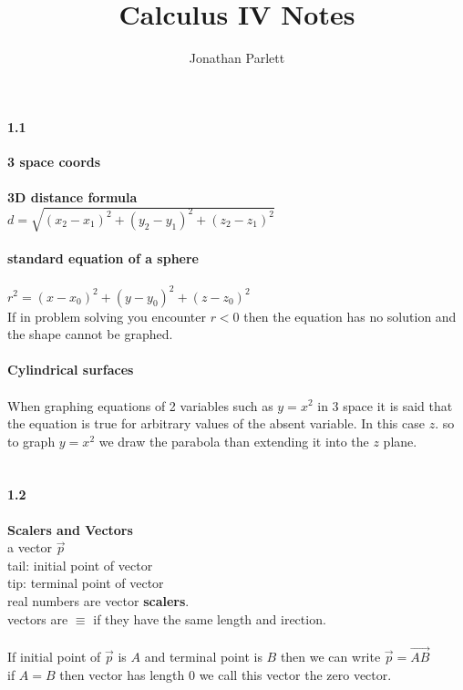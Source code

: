\documentclass[14pt]{extreport}
\title{Calculus IV Notes}
\author{Jonathan Parlett}
\begin{document}
\paragraph{1.1}\textbf{3 space coords}\\\\

\textbf{3D distance formula}\\
$d = \sqrt{(x_2 - x_1)^2 + (y_2 - y_1)^2 + (z_2 - z_1)^2}$\\\\

\textbf{standard equation of a sphere}\\\\
$r^2 = (x - x_0)^2 + (y-y_0)^2 + (z-z_0)^2$\\

If in problem solving you encounter $r < 0$ then the equation has no solution and the shape
cannot be graphed.\\\\

\textbf{Cylindrical surfaces}\\\\

When graphing equations of 2 variables such as $y = x^2$ in 3 space it is said that the equation is true for arbitrary values of the absent variable. In this case $z$. so to graph $y = x^2$ we draw the parabola than extending it into the $z$ plane.\\\\


\paragraph{1.2}\textbf{Scalers and Vectors}\\

a vector $\vec{p}$\\
tail: initial point of vector\\
tip: terminal point of vector\\
real numbers are vector \textbf{scalers}.\\
vectors are $\equiv$ if they have the same length and irection.\\\\

If initial point of $\vec{p}$ is $A$ and terminal point is $B$ then we can write $\vec{p} = \vec{AB}$\\

if $A = B$ then vector has length $0$ we call this vector the zero vector.\\\\
\end{document}
